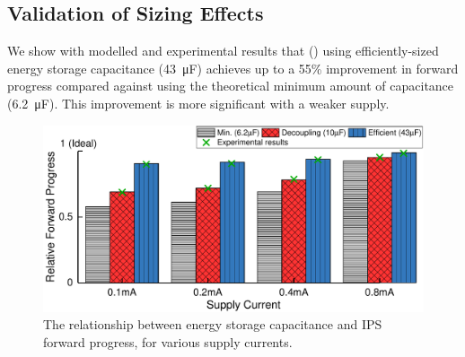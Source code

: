 



\subsection{Validation of Sizing Effects}

We show with modelled and experimental results that () using efficiently-sized energy storage capacitance (\SI{43}{\micro\farad}) achieves up to a 55\% improvement in forward progress compared against using the theoretical minimum amount of capacitance (\SI{6.2}{\micro\farad}). 
This improvement is more significant with a weaker supply. 

\begin{figure}
    \centering
    \includegraphics[width=\columnwidth]{ch3_sizingeffect/figures/ImprValidColorFig1}
    \caption{The relationship between energy storage capacitance and IPS forward progress, for various supply currents. }
    \label{fig:imprvalid1}
\end{figure}

